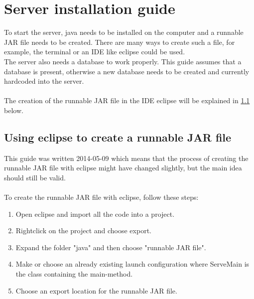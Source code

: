 \section{Server installation guide}
To start the server, java needs to be installed on the computer and a runnable JAR file needs to be created.
There are many ways to create such a file, for example, the terminal or
an IDE like eclipse could be used. \\The server also needs a database to work properly. This guide assumes that a database is present, otherwise a new database needs to be created and currently hardcoded into the server.\\
\\
The creation of the runnable JAR file in the IDE eclipse will be explained in \ref{sec:com_UsingEclipse} below.
\subsection{Using eclipse to create a runnable JAR file}
\label{sec:com_UsingEclipse}
This guide was written 2014-05-09 which means that the process of creating the runnable JAR file with eclipse might have changed slightly, but the main idea should still be valid.\\
\\
To create the runnable JAR file with eclipse, follow these steps:
\begin{enumerate}
\item Open eclipse and import all the code into a project.
\item Rightclick on the project and choose export.
\item Expand the folder "java" and then choose "runnable JAR file".
\item Make or choose an already existing launch configuration where ServeMain is the class containing the main-method.
\item Choose an export location for the runnable JAR file.
\end{enumerate}

